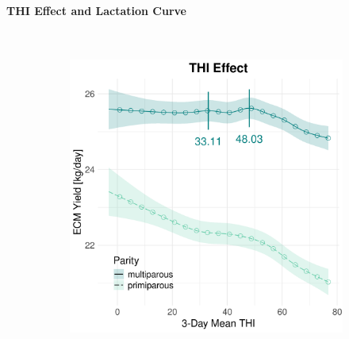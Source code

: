 \newpage
\paragraph{THI Effect and Lactation Curve} \quad \\
\begin{figure}[H]
    \centering
    \begin{subfigure}[b]{0.45\textwidth}
        \centering
        \includegraphics[width=\textwidth]{thesis/figures/models/ecm/after2010/bs_ecm_after2010/bs_ecm_after2010_marginal_thi_milk_combined.png}
    \end{subfigure}
    \hspace{0.05\textwidth} %
    \begin{subfigure}[b]{0.45\textwidth}
        \centering

\end{subfigure}
\end{figure}
